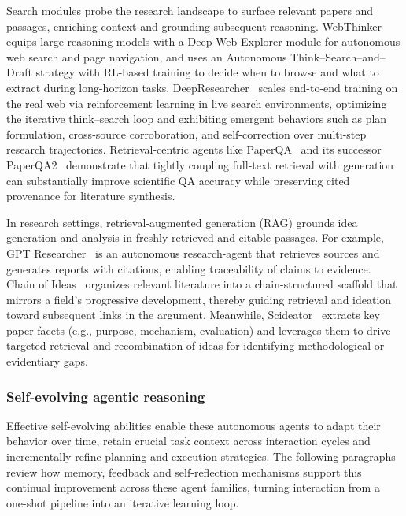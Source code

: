Search modules probe the research landscape to surface relevant papers and passages, enriching context and grounding subsequent reasoning. WebThinker~\cite{li2025webthinkerempoweringlargereasoning} equips large reasoning models with a Deep Web Explorer module for autonomous web search and page navigation, and uses an Autonomous Think–Search–and–Draft strategy with RL-based training to decide when to browse and what to extract during long-horizon tasks. DeepResearcher~\cite{zheng2025deepresearcher} scales end-to-end training on the real web via reinforcement learning in live search environments, optimizing the iterative think–search loop and exhibiting emergent behaviors such as plan formulation, cross-source corroboration, and self-correction over multi-step research trajectories. Retrieval-centric agents like PaperQA~\cite{lála2023paperqaretrievalaugmentedgenerativeagent} and its successor PaperQA2~\cite{skarlinski2024languageagentsachievesuperhuman} demonstrate that tightly coupling full-text retrieval with generation can substantially improve scientific QA accuracy while preserving cited provenance for literature synthesis.

In research settings, retrieval-augmented generation (RAG) grounds idea generation and analysis in freshly retrieved and citable passages. For example, GPT Researcher~\cite{Elovic2023gptresearcher} is an autonomous research-agent that retrieves sources and generates reports with citations, enabling traceability of claims to evidence. Chain of Ideas~\cite{li2024chainideasrevolutionizingresearch} organizes relevant literature into a chain-structured scaffold that mirrors a field’s progressive development, thereby guiding retrieval and ideation toward subsequent links in the argument. Meanwhile, Scideator~\cite{radensky2025scideatorhumanllmscientificidea} extracts key paper facets (e.g., purpose, mechanism, evaluation) and leverages them to drive targeted retrieval and recombination of ideas for identifying methodological or evidentiary gaps.




\subsubsection{Self-evolving agentic reasoning}
\label{sec:app-auto-evolving}



Effective self-evolving abilities enable these autonomous agents to adapt their behavior over time, retain crucial task context across interaction cycles and incrementally refine planning and execution strategies. The following paragraphs review how memory, feedback and self-reflection mechanisms support this continual improvement across these agent families, turning interaction from a one-shot pipeline into an iterative learning loop.





